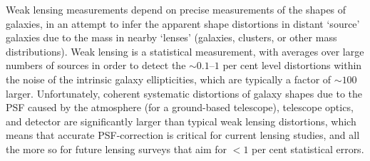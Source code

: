 \documentclass[twocolumn,useAMS,usenatbib]{mn2e}
\begin{document}
Weak lensing measurements depend on precise measurements of the shapes
of galaxies, in an attempt to infer the apparent 
shape distortions in distant `source' galaxies due to the mass in
nearby `lenses' (galaxies, clusters, or other mass distributions).
Weak lensing is a statistical measurement, with averages over
large numbers of sources in order to detect the $\sim 0.1$--$1$ per cent level
distortions within the noise of the intrinsic galaxy ellipticities, which
are typically a factor of $\sim 100$ larger.  Unfortunately, coherent
systematic distortions of galaxy
shapes due to the PSF caused by the atmosphere
(for a ground-based telescope), telescope optics, and detector are
significantly larger than typical weak lensing distortions, which
means that accurate PSF-correction is critical for current lensing
studies, and all the more so for future lensing surveys that aim for
$<1$ per cent statistical errors.
\end{document}
